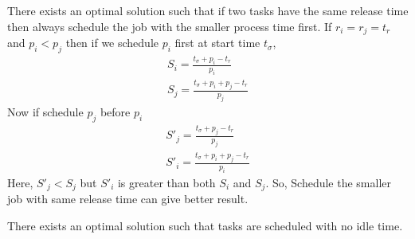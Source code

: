 \documentclass[11pt, conference, onecolumn]{IEEEtran}
\begin{document}
There exists an optimal solution such that if two tasks have the same release time then always schedule the job with the smaller process time first. If $r_i=r_j=t_r$ and $p_i<p_j$ then if we schedule
$p_i$ first at start time $t_{\sigma}$, 
\begin{equation}
\begin{array}{l}
S_{i} = \frac{t_{\sigma} + p_i - t_r}{p_i} \\
S_{j} = \frac{t_{\sigma} + p_i + p_j- t_r}{p_j} 
\end{array} \end{equation}
Now if schedule $p_j$ before $p_i$
\begin{equation}
\begin{array}{l}
S'_{j} = \frac{t_{\sigma} + p_j - t_r}{p_j} \\
S'_{i} = \frac{t_{\sigma} + p_i + p_j- t_r}{p_i} 
\end{array}
\end{equation}
Here, $S'_{j} < S_{j}$ but $S'_{i}$ is greater than both $S_{i}$ and $S_{j}$. So, Schedule the smaller job with 
same release time can give better result.

There exists an optimal solution such that tasks are scheduled with no idle time.
\end{document}
